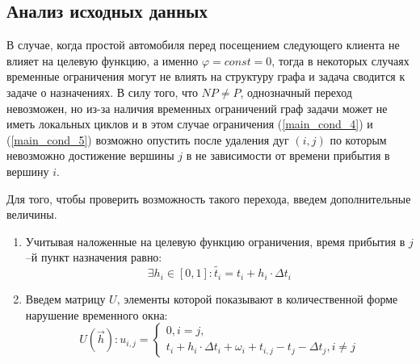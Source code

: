 \documentclass[]{TAACpaper}
\begin{document}
\subsection{Анализ исходных данных}
В случае, когда простой автомобиля перед посещением следующего клиента не влияет на целевую функцию, а именно $\varphi=const=0$, тогда в некоторых случаях временные ограничения могут не влиять на структуру графа и задача сводится к задаче о назначениях. В силу того, что $NP \neq P$, однозначный переход невозможен, но из-за наличия временных ограничений граф задачи может не иметь локальных циклов и в этом случае  ограничения (\ref{main_cond_4}) и (\ref{main_cond_5}) возможно опустить после удаления дуг $(i,j)$ по которым невозможно достижение вершины $j$ в не зависимости от времени прибытия в вершину $i$.

Для того, чтобы проверить возможность такого перехода, введем дополнительные величины. 
\begin{enumerate}
\item Учитывая наложенные на целевую функцию ограничения, время прибытия в $j$–й пункт назначения равно:
\begin{equation} \label{t_j_input}
   \exists h_i \in [0,1] : \tilde{t_i} = t_i + h_i \cdot \Delta t_i
\end{equation}

\item Введем матрицу $U$, элементы которой показывают в количественной форме нарушение временного окна:
\begin{equation} \label{matrix_U}
 U(\vec{h}) : u_{i,j} = 
    \begin{cases}
	  0, i=j, \\
      t_i + h_i \cdot \Delta t_i + \omega_i + t_{i,j} - t_j - \Delta t_j, i \neq j
    \end{cases}   
\end{equation}
\end{enumerate}
\end{document}
